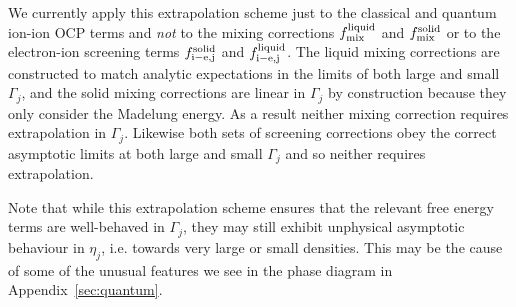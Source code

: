 We currently apply this extrapolation scheme just to the classical and quantum ion-ion OCP terms and \emph{not} to the mixing corrections $f_{\rm mix}^{\rm liquid}$ and $f_{\rm mix}^{\rm solid}$ or to the electron-ion screening terms $f_{\rm i-e,j}^{\rm solid}$ and $f_{\rm i-e,j}^{\rm liquid}$.
The liquid mixing corrections are constructed to match analytic expectations in the limits of both large and small $\Gamma_j$, and the solid mixing corrections are linear in $\Gamma_j$ by construction because they only consider the Madelung energy.
As a result neither mixing correction requires extrapolation in $\Gamma_j$.
Likewise both sets of screening corrections obey the correct asymptotic limits at both large and small $\Gamma_j$ and so neither requires extrapolation.

Note that while this extrapolation scheme ensures that the relevant free energy terms are well-behaved in $\Gamma_j$, they may still exhibit unphysical asymptotic behaviour in $\eta_j$, i.e. towards very large or small densities.
This may be the cause of some of the unusual features we see in the phase diagram in Appendix~\ref{sec:quantum}.



